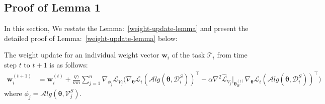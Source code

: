 \subsection{Proof of Lemma 1}
In this section, We restate the Lemma:~\ref{weight-update-lemma} and present the detailed proof of Lemma:~\ref{weight-update-lemma} below:
\begin{lemma*} 
The weight update for an individual weight vector $\mathbf{w}_{i}$ of the task $\mathcal{T}_i$ from time step $t$ to  $t+1$ is as follows:
\begin{align}
\label{weight-update}
    \mathbf{w}_i^{(t+1)}&=\mathbf{w}_i^{(t)} + \frac{\eta \gamma}{mn} \sum_{j=1}^{n} \nabla_{\phi_j} \mathcal{L}_{V_j}  \Big(\nabla_{\boldsymbol{\theta}}\mathcal{L}_i(\mathcal{A}lg(\boldsymbol{\theta}, \mathcal{D}_i^S))^{\intercal} \nonumber
    - \alpha  \nabla^2\widehat{\mathcal{L}}_{V_j}|_{\boldsymbol{\theta}_{W}^{(t)}} \nabla_{\boldsymbol{\theta}}\mathcal{L}_i(\mathcal{A}lg(\boldsymbol{\theta}, \mathcal{D}_i^S))^{\intercal} \Big) 
\end{align}
where $\phi_j=\mathcal{A}lg(\boldsymbol{\theta}, \mathcal{V}_{j}^{S})$.
\end{lemma*}
